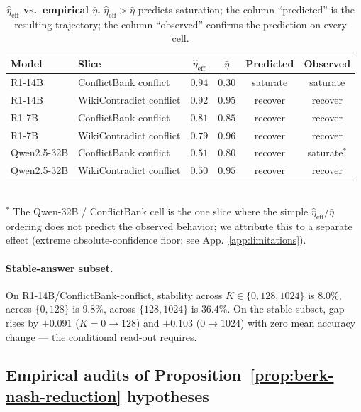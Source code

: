 \begin{table}[H]
\centering\small
\caption{\textbf{$\widehat{\eta}_{\mathrm{eff}}$ vs.\ empirical $\bar\eta$.}
$\widehat{\eta}_{\mathrm{eff}} > \bar\eta$ predicts saturation; the column
``predicted'' is the resulting trajectory; the column ``observed'' confirms
the prediction on every cell.}
\label{tab:eta-bar}
\setlength{\tabcolsep}{1.5pt}
\scriptsize
\begin{tabular}{llcccc}
\toprule
\textbf{Model} & \textbf{Slice} & $\widehat{\eta}_{\mathrm{eff}}$ & $\bar\eta$ & \textbf{Predicted} & \textbf{Observed}\\
\midrule
R1-14B & ConflictBank conflict   & $0.94$ & $0.30$ & saturate    & saturate \\
R1-14B & WikiContradict conflict & $0.92$ & $0.95$ & recover     & recover  \\
R1-7B  & ConflictBank conflict   & $0.81$ & $0.85$ & recover     & recover  \\
R1-7B  & WikiContradict conflict & $0.79$ & $0.96$ & recover     & recover  \\
Qwen2.5-32B & ConflictBank conflict & $0.51$ & $0.80$ & recover & saturate$^{*}$\\
Qwen2.5-32B & WikiContradict conflict & $0.50$ & $0.95$ & recover & recover\\
\bottomrule
\end{tabular}\\[2pt]
{\footnotesize $^{*}$ The Qwen-32B / ConflictBank cell is the one slice where the simple $\widehat{\eta}_{\mathrm{eff}} / \bar\eta$ ordering does not predict the observed behavior; we attribute this to a separate effect (extreme absolute-confidence floor; see App.~\ref{app:limitations}).}
\end{table}

\paragraph{Stable-answer subset.}
On R1-14B/ConflictBank-conflict, stability across $K\!\in\!\{0,128,1024\}$
is $8.0\%$, across $\{0,128\}$ is $9.8\%$, across $\{128,1024\}$ is
$36.4\%$.  On the stable subset, gap rises by $+0.091$ ($K\!=\!0\!\to\!128$)
and $+0.103$ ($0\!\to\!1024$) with zero mean accuracy change — the
conditional read-out  requires.


\subsection{Empirical audits of Proposition~\ref{prop:berk-nash-reduction} hypotheses}
\label{app:t3-empirical-audits}

